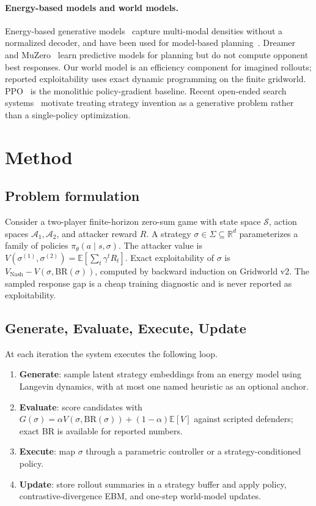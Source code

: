 \documentclass[11pt]{article}
\begin{document}
\paragraph{Energy-based models and world models.}
Energy-based generative models~\cite{du2019implicit,grathwohl2020jem} capture multi-modal densities without a normalized decoder, and have been used for model-based planning~\cite{du2019ebmplanning}.
Dreamer~\cite{hafner2020dreamer} and MuZero~\cite{schrittwieser2020muzero} learn predictive models for planning but do not compute opponent best responses.
Our world model is an efficiency component for imagined rollouts; reported exploitability uses exact dynamic programming on the finite gridworld.
PPO~\cite{schulman2017ppo} is the monolithic policy-gradient baseline.
Recent open-ended search systems~\cite{novikov2025alphaevolve} motivate treating strategy invention as a generative problem rather than a single-policy optimization.


\section{Method}

\subsection{Problem formulation}
Consider a two-player finite-horizon zero-sum game with state space $\mathcal{S}$, action spaces $\mathcal{A}_1,\mathcal{A}_2$, and attacker reward $R$.
A strategy $\sigma\in\Sigma\subseteq\mathbb{R}^d$ parameterizes a family of policies $\pi_\theta(a\mid s,\sigma)$.
The attacker value is $V(\sigma^{(1)},\sigma^{(2)})=\mathbb{E}[\sum_t \gamma^t R_t]$.
Exact exploitability of $\sigma$ is $V_{\mathrm{Nash}}-V(\sigma,\mathrm{BR}(\sigma))$, computed by backward induction on Gridworld v2.
The sampled response gap is a cheap training diagnostic and is never reported as exploitability.

\subsection{Generate, Evaluate, Execute, Update}

At each iteration the system executes the following loop.
\begin{enumerate}
  \item \textbf{Generate}: sample latent strategy embeddings from an energy model using Langevin dynamics, with at most one named heuristic as an optional anchor.
  \item \textbf{Evaluate}: score candidates with $G(\sigma)=\alpha V(\sigma,\mathrm{BR}(\sigma))+(1-\alpha)\mathbb{E}[V]$ against scripted defenders; exact BR is available for reported numbers.
  \item \textbf{Execute}: map $\sigma$ through a parametric controller or a strategy-conditioned policy.
  \item \textbf{Update}: store rollout summaries in a strategy buffer and apply policy, contrastive-divergence EBM, and one-step world-model updates.
\end{enumerate}
\end{document}
